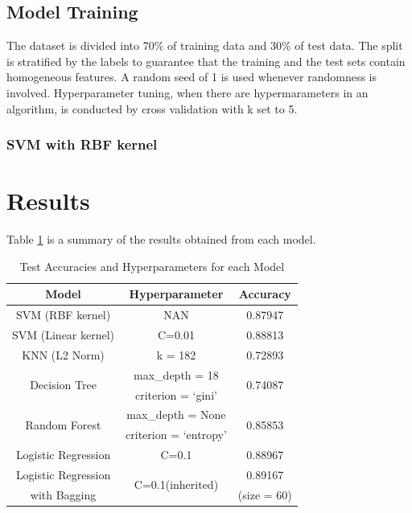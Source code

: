 \documentclass[10pt,twocolumn,letterpage]{article}
\begin{document}
	\subsection{Model Training}
	The dataset is divided into 70\% of training data and 30\% of test data. The split is stratified by the labels to guarantee that the training and the test sets contain homogeneous features. A random seed of 1 is used whenever randomness is involved. Hyperparameter tuning, when there are hypermarameters in an algorithm, is conducted by cross validation with k set to 5. 
	\subsubsection{SVM with RBF kernel}
	\section{Results}
	Table \ref{results} is a summary of the results obtained from each model. 
	\begin{table}[H]
		\begin{tabular}{|c|c|c|}
			\hline
			Model & Hyperparameter & Accuracy\\
			\hline 
			\hline
			SVM (RBF kernel) & NAN & 0.87947\\
			\hline
			SVM (Linear kernel) & C=0.01 & 0.88813\\
			\hline
			KNN (L2 Norm) & k = 182 & 0.72893\\
			\hline
			\multirow{2}{*}{Decision Tree}  & \small{max\_depth = 18} & \multirow{2}{*}{0.74087}\\
			                                 & \small{criterion = ‘gini’} & \\
			\hline
			\multirow{2}{*}{Random Forest} & \small{max\_depth = None} & \multirow{2}{*}{0.85853}\\
			 & \small{criterion = ‘entropy’}& \\
			\hline
			Logistic Regression & C=0.1 & 0.88967\\
			\hline
			Logistic Regression & \multirow{2}{*}{C=0.1(inherited)} & 0.89167 \\
			with Bagging & & (size = 60)\\
			\hline		
		\end{tabular}
		\caption{Test Accuracies and Hyperparameters for each Model}\label{results}
	\end{table}
\end{document}
